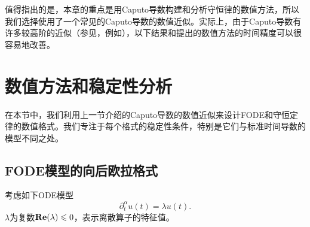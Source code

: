 值得指出的是，本章的重点是用Caputo导数构建和分析守恒律的数值方法，所以我们选择使用了一个常见的Caputo导数的数值近似。实际上，由于Caputo导数有许多较高阶的近似（参见，例如），以下结果和提出的数值方法的时间精度可以很容易地改善。


\section{数值方法和稳定性分析}

在本节中，我们利用上一节介绍的Caputo导数的数值近似来设计FODE和守恒定律的数值格式。我们专注于每个格式的稳定性条件，特别是它们与标准时间导数的模型不同之处。
\subsection{FODE模型的向后欧拉格式}
考虑如下ODE模型
\begin{equation}\label{mod:ode}
\partial_t^\alpha u(t)=\lambda u(t).
\end{equation}
$\lambda$为复数${\bf Re} (\lambda) \le 0$，表示离散算子的特征值。

